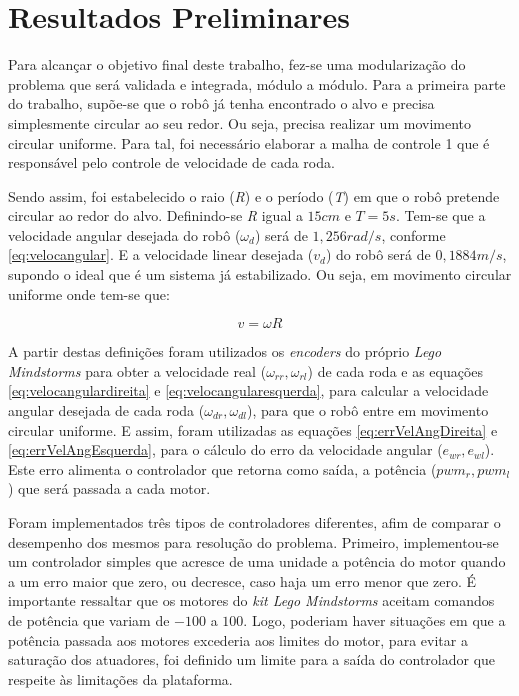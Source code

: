 \chapter{Resultados Preliminares}
\label{chap:resultados}
Para alcançar o objetivo final deste trabalho, fez-se uma modularização do problema que será validada e integrada, módulo a módulo. Para a primeira parte do trabalho, supõe-se que o robô já tenha encontrado o alvo e precisa simplesmente circular ao seu redor. Ou seja, precisa realizar um movimento circular uniforme. Para tal, foi necessário elaborar a malha de controle 1 que é responsável pelo controle de velocidade de cada roda. 

Sendo assim, foi estabelecido o raio (\emph{R}) e o período (\emph{T}) em que o robô pretende circular ao redor do alvo. Definindo-se \emph{R} igual a $15cm$ e $T = 5s$. Tem-se que a velocidade angular desejada do robô ($\omega_{d}$) será de $1,256 rad/s$, conforme \autoref{eq:velocangular}. E a velocidade linear desejada ($v_{d}$) do robô será de $0,1884 m/s$, supondo o ideal que é um sistema já estabilizado. Ou seja, em movimento circular uniforme onde tem-se que: 

\begin{equation}
v = \omega R 
\label{eq:veloclinear}
\end{equation}

A partir destas definições foram utilizados os \emph{encoders} do próprio \emph{Lego Mindstorms\textregistered} para obter a velocidade real ($\omega_{rr},\omega_{rl}$) de cada roda e as equações \ref{eq:velocangulardireita} e \ref{eq:velocangularesquerda}, para calcular a velocidade angular desejada de cada roda ($\omega_{dr},\omega_{dl}$), para que o robô entre em movimento circular uniforme. E assim, foram utilizadas as equações \ref*{eq:errVelAngDireita} e \ref*{eq:errVelAngEsquerda}, para o cálculo do erro da velocidade angular ($e_{wr},e_{wl}$). Este erro alimenta o controlador que retorna como saída, a potência ($pwm_{r}, pwm_{l}$) que será passada a cada motor.

Foram implementados três tipos de controladores diferentes, afim de comparar o desempenho dos mesmos para resolução do problema. Primeiro, implementou-se um controlador simples que acresce de uma unidade a potência do motor quando a um erro maior que zero, ou decresce, caso haja um erro menor que zero. É importante ressaltar que os motores do \emph{kit Lego Mindstorms\textregistered} aceitam comandos de potência que variam de $-100$ a $100$. Logo, poderiam haver situações em que a potência passada aos motores excederia aos limites do motor, para evitar a saturação dos atuadores, foi definido um limite para a saída do controlador que respeite às limitações da plataforma.

